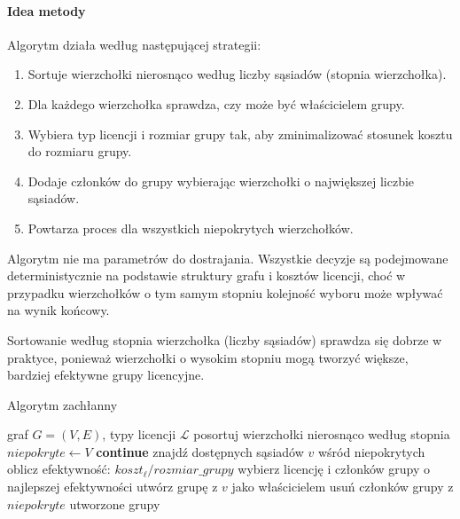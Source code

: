\paragraph{Idea metody}
Algorytm działa według następującej strategii:
\begin{enumerate}
  \item Sortuje wierzchołki nierosnąco według liczby sąsiadów (stopnia wierzchołka).
  \item Dla każdego wierzchołka sprawdza, czy może być właścicielem grupy.
  \item Wybiera typ licencji i rozmiar grupy tak, aby zminimalizować stosunek kosztu do rozmiaru grupy.
  \item Dodaje członków do grupy wybierając wierzchołki o największej liczbie sąsiadów.
  \item Powtarza proces dla wszystkich niepokrytych wierzchołków.
\end{enumerate}

Algorytm nie ma parametrów do dostrajania. Wszystkie decyzje są podejmowane deterministycznie na podstawie struktury grafu i kosztów licencji, choć w przypadku wierzchołków o tym samym stopniu kolejność wyboru może wpływać na wynik końcowy.

Sortowanie według stopnia wierzchołka (liczby sąsiadów) sprawdza się dobrze w praktyce, ponieważ wierzchołki o wysokim stopniu mogą tworzyć większe, bardziej efektywne grupy licencyjne.

\begin{algorithm}[H]
  \caption{Algorytm zachłanny}
  \label{alg:greedy}
  \begin{algorithmic}[1]
    \Require graf $G=(V,E)$, typy licencji $\mathcal{L}$
    \State posortuj wierzchołki nierosnąco według stopnia
    \State $niepokryte \gets V$
     \textbf{continue} \EndIf
    \State znajdź dostępnych sąsiadów $v$ wśród niepokrytych
    \State oblicz efektywność: $koszt_\ell / rozmiar\_grupy$
    \EndFor
    \State wybierz licencję i członków grupy o najlepszej efektywności
    \State utwórz grupę z $v$ jako właścicielem
    \State usuń członków grupy z $niepokryte$
    \EndFor
    \State \Return utworzone grupy
  \end{algorithmic}
\end{algorithm}



